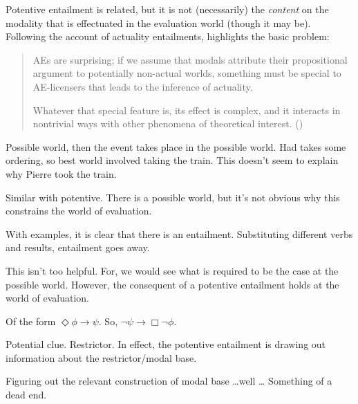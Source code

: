 \begin{note}
  Potentive entailment is related, but it is not (necessarily) the \emph{content} on the modality that is effectuated in the evaluation world (though it may be).
  Following the account of actuality entailments, \citeauthor{Alxatib:2019wf} highlights the basic problem:

  \begin{quote}
    AEs are surprising; if we assume that modals attribute their propositional argument to potentially non-actual worlds, something must be special to AE-licensers that leads to the inference of actuality.

    Whatever that special feature is, its effect is complex, and it interacts in nontrivial ways with other phenomena of theoretical interest.\nolinebreak
    \mbox{}\hfill\mbox{(\citeyear[701]{Alxatib:2019wf})}
  \end{quote}

  Possible world, then the event takes place in the possible world.
  Had takes some ordering, so best world involved taking the train.
  This doesn't seem to explain why Pierre took the train.

  Similar with potentive.
  There is a possible world, but it's not obvious why this constrains the world of evaluation.

  With examples, it is clear that there is an entailment.
  Substituting different verbs and results, entailment goes away.
  

  

  This isn't too helpful.
  For, we would see what is required to be the case at the possible world.
  However, the consequent of a potentive entailment holds at the world of evaluation.

  Of the form \(\Diamond \phi \rightarrow \psi\).
  So, \(\lnot \psi \rightarrow \Box \lnot \phi\).

  Potential clue.
  Restrictor.
  In effect, the potentive entailment is drawing out information about the restrictor/modal base.

  Figuring out the relevant construction of modal base \dots well \dots
  Something of a dead end.
\end{note}

